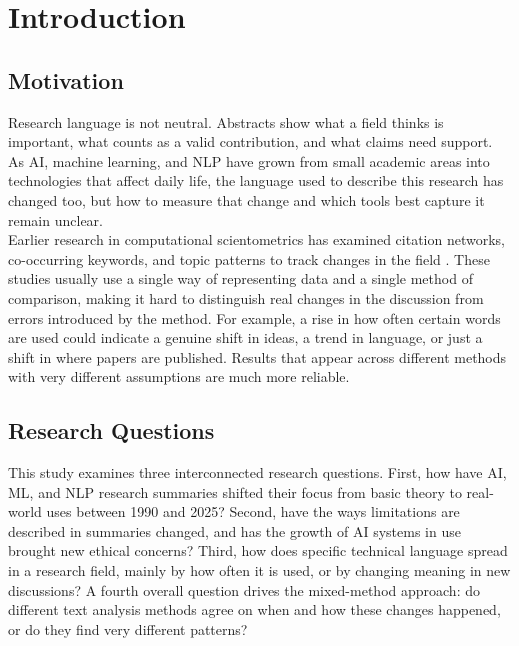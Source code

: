 \section{Introduction}
\thispagestyle{gitfooter}
\subsection{Motivation}

Research language is not neutral. Abstracts show what a field thinks is important, what counts as a valid contribution, and what claims need support. As AI, machine learning, and NLP have grown from small academic areas into technologies that affect daily life, the language used to describe this research has changed too, but how to measure that change and which tools best capture it remain unclear.\\

Earlier research in computational scientometrics has examined citation networks, co-occurring keywords, and topic patterns to track changes in the field \citep{chavalarias2013,krenn2020}. These studies usually use a single way of representing data and a single method of comparison, making it hard to distinguish real changes in the discussion from errors introduced by the method. For example, a rise in how often certain words are used could indicate a genuine shift in ideas, a trend in language, or just a shift in where papers are published. Results that appear across different methods with very different assumptions are much more reliable.

\newpage
\subsection{Research Questions}

This study examines three interconnected research questions. First, how have AI, ML, and NLP research summaries shifted their focus from basic theory to real-world uses between 1990 and 2025? Second, have the ways limitations are described in summaries changed, and has the growth of AI systems in use brought new ethical concerns? Third, how does specific technical language spread in a research field, mainly by how often it is used, or by changing meaning in new discussions? A fourth overall question drives the mixed-method approach: do different text analysis methods agree on when and how these changes happened, or do they find very different patterns?

